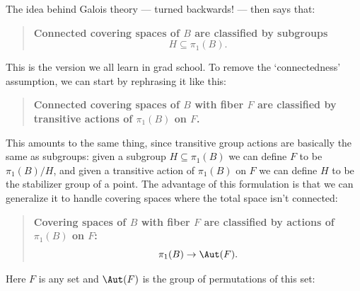 \documentclass{amsart}
\begin{document}
The idea behind Galois theory --- turned backwards! ---
then says that:

\begin{quote}
\textbf{Connected covering spaces of $B$
are classified by subgroups 
\[ H \subseteq \pi_1(B).\] 
}
\end{quote}

\noindent
This is the version we all learn in grad school.
To remove the `connectedness' assumption, we can start by
rephrasing it like this:

\begin{quote}
\textbf{Connected covering spaces of $B$
with fiber $F$ are classified by transitive actions of $\pi_1(B)$ 
on $F$.}
\end{quote}

\noindent
This amounts to the same thing, since 
transitive group actions are basically the same as subgroups:
given a subgroup $H \subseteq \pi_1(B)$ we can define $F$
to be $\pi_1(B)/H$, and given a transitive action of $\pi_1(B)$
on $F$ we can define $H$ to be the stabilizer group of a point.
The advantage of this formulation is that we can generalize it
to handle covering spaces where the total space isn't connected:

\begin{quote}
\textbf{Covering spaces of $B$ with fiber $F$ are classified
by actions of $\pi_1(B)$ on $F$:
\[          \pi_1(B) \to \Aut(F).   \]}
\end{quote}

\noindent
Here $F$ is any set and $\Aut(F)$ is the group of permutations
of this set:
\end{document}
